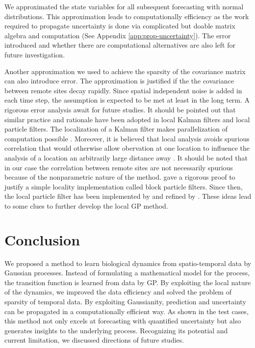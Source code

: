 \documentclass[11pt, reqno]{amsart}
\begin{document}
We approximated the state variables for all subsequent forecasting with normal distributions. This approximation leads to computationally efficiency as the work required to propagate  uncertainty is done via complicated but doable matrix algebra and computation (See Appendix \ref{app:prop-uncertainty}). The error introduced and whether there are computational alternatives are also left for future investigation.

Another approximation we used to achieve the sparsity of the covariance matrix can also introduce error. The approximation is justified if the the covariance between remote sites decay rapidly. Since spatial independent noise is added in each time step, the assumption is expected to be met at least in the long term. A rigorous error analysis await for future studies. It should be pointed out that similar practice and rationale have been adopted in local Kalman filters and local particle filters. The localization of a Kalman filter makes parallelization of computation possible \citep{ott2004local,Hunt2007,szunyogh2008local}. Moreover, it is believed that local analysis avoids spurious correlation that would otherwise allow obervation at one location to influence the analysis of a  location an arbitrarily large distance away \citep{Hunt2007}. It should be noted that in our case the correlation between remote sites are not necessarily spurious because of the nonparametric nature of the method. \cite{Rebeschini2015} gave a rigorous proof to justify a simple locality implementation called block particle filters. Since then, the local particle filter has been implemented by \cite{morzfeld2018variational,farchi2018comparison} and refined by  \cite{Quinn2019}. These ideas lead to some clues to further develop the local GP method.     


\section{Conclusion}
We proposed a method to learn biological dynamics from spatio-temporal data by Gaussian processes.  Instead of formulating a mathematical model for the process,  the transition function is learned from data by GP. By exploiting the local nature of the dynamics, we improved the data efficiency and solved the problem of sparsity of temporal data. By exploiting Gaussianity, prediction and uncertainty can be propagated in a computationally efficient way. As shown in the test cases, this method not only excels at forecasting with quantified uncertainty but also generates insights to the underlying process. Recognizing its potential and current limitation, we discussed directions of future studies. 
\end{document}
